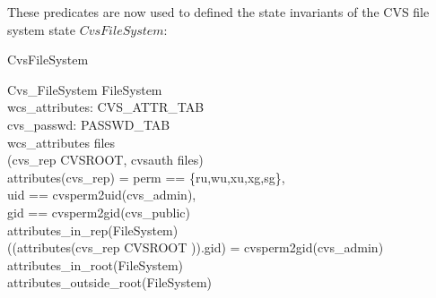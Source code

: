 These predicates are now used to defined the state invariants of the CVS file
system state $CvsFileSystem$:
\begin{doc}{CvsFileSystem}
  \begin{schema}{Cvs\_FileSystem}
    FileSystem \\
    wcs\_attributes: CVS\_ATTR\_TAB \\
    cvs\_passwd: PASSWD\_TAB \\
    \where 
    \dom wcs\_attributes \subseteq \dom files \\
    (cvs\_rep \cat \langle CVSROOT, cvsauth \rangle \isfilein files) \\
    attributes(cvs\_rep) = \lblot \< perm == \{ru,wu,xu,xg,sg\}, \\
    uid  == cvsperm2uid(cvs\_admin), \\
    gid  == cvsperm2gid(cvs\_public)\rblot \> \\
%
    attributes\_in\_rep(\theta FileSystem) \\
    ((attributes(cvs\_rep \cat \langle CVSROOT \rangle)).gid) =
    cvsperm2gid(cvs\_admin) \\ 

    attributes\_in\_root(\theta FileSystem) \\
    attributes\_outside\_root(\theta FileSystem) \\
  \end{schema}
\end{doc}


